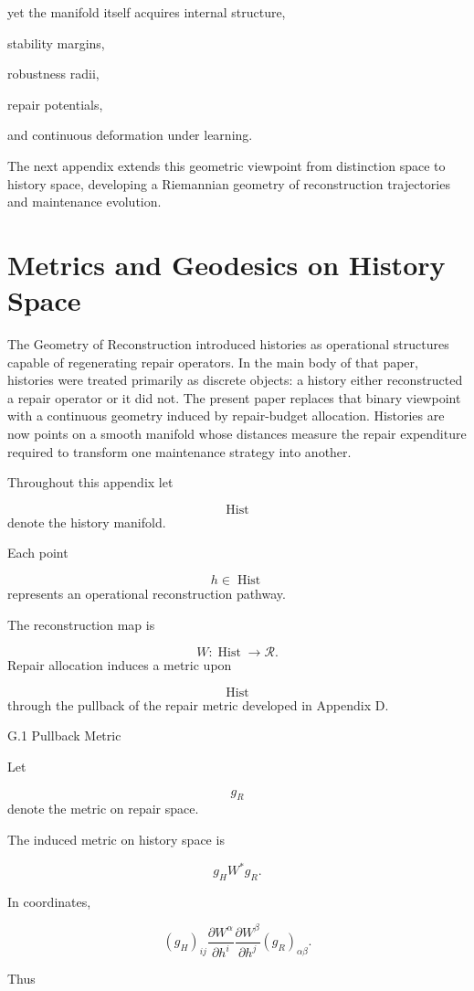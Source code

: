 \documentclass[12pt,oneside]{article}
\theoremstyle{plain}
\theoremstyle{definition}
\theoremstyle{remark}
\DeclareMathOperator{\Hist}{Hist}
\begin{document}
yet the manifold itself acquires internal structure,

stability margins,

robustness radii,

repair potentials,

and continuous deformation under learning.

The next appendix extends this geometric viewpoint from distinction space to history space, developing a Riemannian geometry of reconstruction trajectories and maintenance evolution.

\section{Metrics and Geodesics on History Space}

The Geometry of Reconstruction introduced histories as operational structures capable of regenerating repair operators. In the main body of that paper, histories were treated primarily as discrete objects: a history either reconstructed a repair operator or it did not. The present paper replaces that binary viewpoint with a continuous geometry induced by repair-budget allocation. Histories are now points on a smooth manifold whose distances measure the repair expenditure required to transform one maintenance strategy into another.

Throughout this appendix let

\[
\Hist
\]
denote the history manifold.

Each point

\[
h\in\Hist
\]
represents an operational reconstruction pathway.

The reconstruction map is

\[
W:\Hist
\rightarrow
\mathcal R.
\]
Repair allocation induces a metric upon

\[
\Hist
\]
through the pullback of the repair metric developed in Appendix D.


G.1 Pullback Metric

Let

\[
g_R
\]
denote the metric on repair space.

The induced metric on history space is

\[
g_H
W^*g_R.
\]

In coordinates,

\[
(g_H)_{ij}
\frac{\partial W^\alpha}
{\partial h^i}
\frac{\partial W^\beta}
{\partial h^j}
(g_R)_{\alpha\beta}.
\]

Thus
\end{document}
